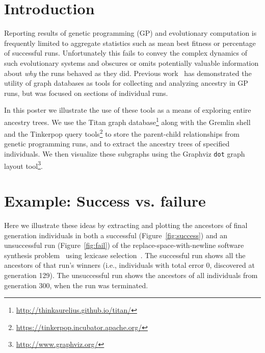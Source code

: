\documentclass{sig-alternate}
\begin{document}

\printccsdesc


\section{Introduction}
\label{sec:introduction}

Reporting results of genetic programming (GP) and evolutionary computation is frequently limited to aggregate statistics such as mean best fitness or percentage of successful runs. Unfortunately this fails to convey the complex dynamics of such evolutionary systems and obscures or omits potentially valuable information about \emph{why} the runs behaved as they did. Previous work~\cite{McPhee:2015:GPTP} has demonstrated the utility of graph databases as tools for collecting and analyzing ancestry in GP runs, but was focused on sections of individual runs.

In this poster we illustrate the use of these tools as a means of exploring entire ancestry trees. We use the Titan graph database\footnote{\url{http://thinkaurelius.github.io/titan/}} along with the Gremlin shell and the Tinkerpop query tools\footnote{\url{https://tinkerpop.incubator.apache.org/}} to store the parent-child relationships from genetic programming runs, and to extract the ancestry trees of specified individuals. We then visualize these subgraphs using the Graphviz \texttt{dot} graph layout tool\footnote{\url{http://www.graphviz.org/}}.

\section{Example: Success vs. failure}
\label{sec:examples}

Here we illustrate these ideas by extracting and plotting the ancestors of final generation individuals in both a successful (Figure~\ref{fig:success}) and an unsuccessful run (Figure~\ref{fig:fail}) of the replace-space-with-newline software synthesis problem~\cite{Helmuth:2015:GECCO,Helmuth:2015:dissertation} using lexicase selection~\cite{Helmuth:2014:ieeeTEC}. The successful run shows all the ancestors of that run's winners (i.e., individuals with total error 0, discovered at generation 129). The unsuccessful run shows the ancestors of all individuals from generation 300, when the run was terminated.
\end{document}
